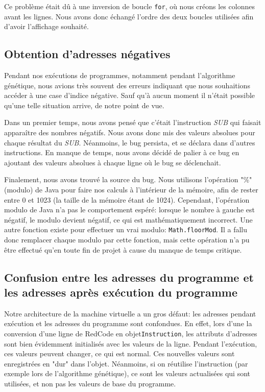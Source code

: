 \documentclass[hidelinks]{report}
\begin{document}
Ce problème était dû à une inversion de boucle \texttt{for}, où nous créons les colonnes avant les lignes. Nous avons donc échangé l'ordre des deux boucles utilisées afin d'avoir l'affichage souhaité.
\subsection{Obtention d'adresses négatives \label{subsec:bug1}}
Pendant nos exécutions de programmes, notamment pendant l'algorithme génétique, nous avions très souvent des erreurs indiquant que nous souhaitions accéder à une case d'indice négative. Sauf qu'à aucun moment il n'était possible qu'une telle situation arrive, de notre point de vue.

Dans un premier temps, nous avons pensé que c'était l'instruction \emph{SUB} qui faisait apparaître des nombres négatifs. Nous avons donc mis des valeurs absolues pour chaque résultat du \emph{SUB}. Néanmoins, le bug persista, et se déclara dans d'autres instructions. En manque de temps, nous avons décidé de palier à ce bug en ajoutant des valeurs absolues à chaque ligne où le bug se déclenchait.

Finalement, nous avons trouvé la source du bug. Nous utilisons l'opération "\%" (modulo) de Java pour faire nos calculs à l'intérieur de la mémoire, afin de rester entre 0 et 1023 (la taille de la mémoire étant de 1024). Cependant, l'opération modulo de Java n'a pas le comportement espéré: lorsque le nombre à gauche est négatif, le modulo devient négatif, ce qui est mathématiquement incorrect. Une autre fonction existe pour effectuer un vrai modulo: \texttt{Math.floorMod}. Il a fallu donc remplacer chaque modulo par cette fonction, mais cette opération n'a pu être effectué qu'en toute fin de projet à cause du manque de temps critique.
\subsection{Confusion entre les adresses du programme et les adresses après exécution du programme\label{subsec:bug2}}
Notre architecture de la machine virtuelle a un gros défaut: les adresses pendant exécution et les adresses du programme sont confondues. En effet, lors d'une la conversion d'une ligne de RedCode en objet\texttt{Instruction}, les attributs d'adresses sont bien évidemment initialisés avec les valeurs de la ligne. Pendant l'exécution, ces valeurs peuvent changer, ce qui est normal. Ces nouvelles valeurs sont enregistrées en "dur" dans l'objet. Néanmoins, si on réutilise l'instruction (par exemple lors de l'algorithme génétique), ce sont les valeurs actualisées qui sont utilisées, et non pas les valeurs de base du programme. 
\end{document}
